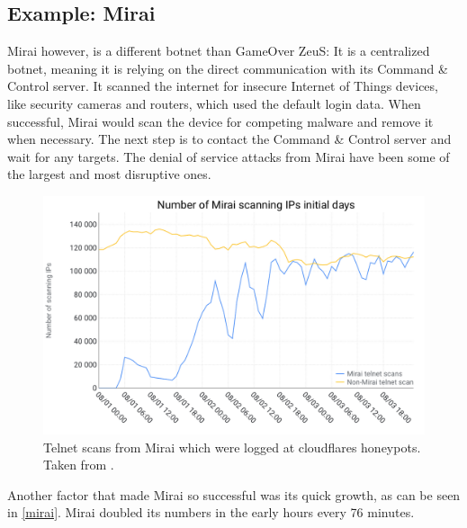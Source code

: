 \documentclass[10pt, a4paper, twocolumn]{article} %
\begin{document}
\subsection{Example: Mirai}
	Mirai however, is a different botnet than GameOver ZeuS: It is a centralized botnet, meaning it is relying on the direct communication with its Command \& Control server. It scanned the internet for insecure Internet of Things devices, like security cameras and routers, which used the default login data. When successful, Mirai would scan the device for competing malware and remove it when necessary. The next step is to contact the Command \& Control server and wait for any targets. The denial of service attacks from Mirai have been some of the largest and most disruptive ones\cite{mirai}. 
	
	\begin{figure}[ht]
		\includegraphics[width=\linewidth]{figures/mirai-initial-day-scanning-ips.png}
		\caption{Telnet scans from Mirai which were logged at cloudflares honeypots. Taken from \citet{cloudflare}. }
		\label{mirai}
    \end{figure}
	Another factor that made Mirai so successful was its quick growth, as can be seen in \autoref{mirai}. Mirai doubled its numbers in the early hours every 76 minutes\cite{cloudflare}.
\end{document}
